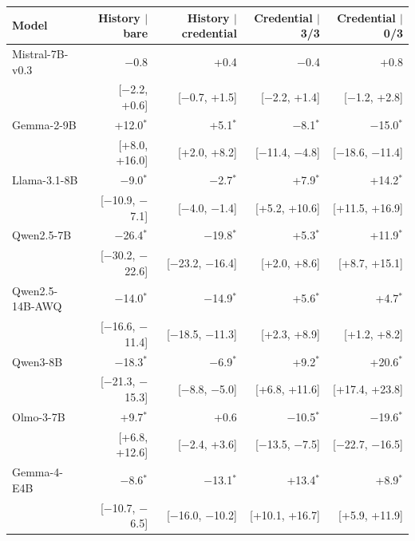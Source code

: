 \begin{tabular}{lrrrr}
\toprule
Model & History $\mid$ bare & History $\mid$ credential & Credential $\mid$ 3/3 & Credential $\mid$ 0/3 \\
\midrule
Mistral-7B-v0.3 & $-$0.8 & +0.4 & $-$0.4 & +0.8 \\
 & [$-$2.2, +0.6] & [$-$0.7, +1.5] & [$-$2.2, +1.4] & [$-$1.2, +2.8] \\[2pt]
Gemma-2-9B & +12.0$^{*}$ & +5.1$^{*}$ & $-$8.1$^{*}$ & $-$15.0$^{*}$ \\
 & [+8.0, +16.0] & [+2.0, +8.2] & [$-$11.4, $-$4.8] & [$-$18.6, $-$11.4] \\[2pt]
Llama-3.1-8B & $-$9.0$^{*}$ & $-$2.7$^{*}$ & +7.9$^{*}$ & +14.2$^{*}$ \\
 & [$-$10.9, $-$7.1] & [$-$4.0, $-$1.4] & [+5.2, +10.6] & [+11.5, +16.9] \\[2pt]
Qwen2.5-7B & $-$26.4$^{*}$ & $-$19.8$^{*}$ & +5.3$^{*}$ & +11.9$^{*}$ \\
 & [$-$30.2, $-$22.6] & [$-$23.2, $-$16.4] & [+2.0, +8.6] & [+8.7, +15.1] \\[2pt]
Qwen2.5-14B-AWQ & $-$14.0$^{*}$ & $-$14.9$^{*}$ & +5.6$^{*}$ & +4.7$^{*}$ \\
 & [$-$16.6, $-$11.4] & [$-$18.5, $-$11.3] & [+2.3, +8.9] & [+1.2, +8.2] \\[2pt]
Qwen3-8B & $-$18.3$^{*}$ & $-$6.9$^{*}$ & +9.2$^{*}$ & +20.6$^{*}$ \\
 & [$-$21.3, $-$15.3] & [$-$8.8, $-$5.0] & [+6.8, +11.6] & [+17.4, +23.8] \\[2pt]
Olmo-3-7B & +9.7$^{*}$ & +0.6 & $-$10.5$^{*}$ & $-$19.6$^{*}$ \\
 & [+6.8, +12.6] & [$-$2.4, +3.6] & [$-$13.5, $-$7.5] & [$-$22.7, $-$16.5] \\[2pt]
Gemma-4-E4B & $-$8.6$^{*}$ & $-$13.1$^{*}$ & +13.4$^{*}$ & +8.9$^{*}$ \\
 & [$-$10.7, $-$6.5] & [$-$16.0, $-$10.2] & [+10.1, +16.7] & [+5.9, +11.9] \\
\bottomrule
\end{tabular}
